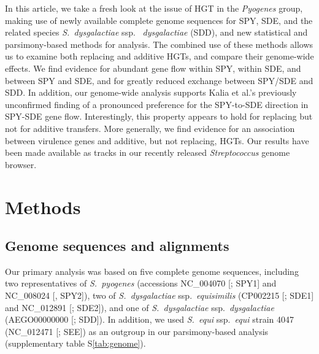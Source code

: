 \documentclass[12pt]{article}
\begin{document}
In this article, we take a fresh look at the issue of HGT in the {\em
  Pyogenes} group, making use of newly available complete genome sequences
for SPY, SDE, and the related species {\em S.\ dysgalactiae} ssp.\ {\em
  dysgalactiae} (SDD), and new statistical and parsimony-based methods for
analysis.  The combined use of these methods allows us to examine both
replacing and additive HGTs, and compare their genome-wide effects.  We
find evidence for abundant gene flow within SPY, within SDE, and between
SPY and SDE, and for greatly reduced exchange between SPY/SDE and SDD.  In
addition, our genome-wide analysis supports Kalia et al.'s
\citeyearpar{Kalia2001} previously unconfirmed finding of a pronounced
preference for the SPY-to-SDE direction in SPY-SDE gene flow.
Interestingly, this property appears to hold for replacing but not for
additive transfers.  More generally, we find evidence for an association
between virulence genes and additive, but not replacing, HGTs.  Our results
have been made available as tracks in our recently released {\em
  Streptococcus} genome browser.

\section*{Methods}

\subsection*{Genome sequences and alignments}

Our primary analysis was based on five complete genome sequences, including
two representatives of {\em S.\ pyogenes} (accessions NC\_004070
[\citealp{Beres2002}; SPY1] and NC\_008024 [\citealp{Beres2006}, SPY2]),
two of {\em S.\ dysgalactiae} ssp.\ {\em equisimilis} (CP002215
[\citealp{Suzuki2011}; SDE1] and NC\_012891 [\citealp{Shimomura2011};
SDE2]), and one of {\em S.\ dysgalactiae} ssp.\ {\em dysgalactiae}
(AEGO00000000 [\citealp{Suzuki2011}; SDD]).  In addition, we used 
\textit{S.\ equi} ssp.\textit{\ equi} strain 4047 (NC\_012471
[\citealp{Holden2009}; SEE]) as an outgroup in our parsimony-based
analysis (supplementary table S\ref{tab:genome}).
 
\end{document}
